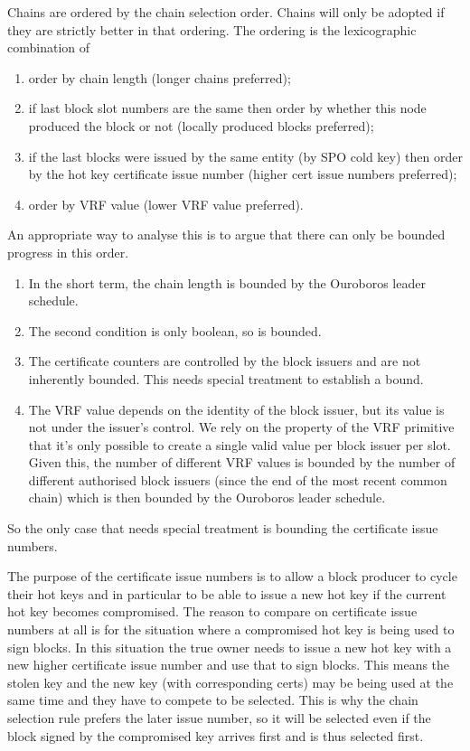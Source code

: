 \documentclass[11pt,a4paper]{article}
\begin{document}
Chains are ordered by the chain selection order. Chains will only be adopted if
they are strictly better in that ordering. The ordering is the lexicographic
combination of
\begin{enumerate}
\item order by chain length (longer chains preferred);
\item if last block slot numbers are the same then order by whether this node produced the block or not (locally produced blocks preferred);
\item if the last blocks were issued by the same entity (by SPO cold key) then order by the hot key certificate issue number (higher cert issue numbers preferred);
\item order by VRF value (lower VRF value preferred).
\end{enumerate}
An appropriate way to analyse this is to argue that there can only be bounded
progress in this order.
\begin{enumerate}
\item In the short term, the chain length is bounded by the Ouroboros leader
      schedule.
\item The second condition is only boolean, so is bounded.
\item The certificate counters are controlled by the block issuers and are not
      inherently bounded. This needs special treatment to establish a bound.
\item The VRF value depends on the identity of the block issuer, but its value
      is not under the issuer's control. We rely on the property of the VRF
      primitive that it's only possible to create a single valid value per
      block issuer per slot. Given this, the number of different VRF values is
      bounded by the number of different authorised block issuers (since the
      end of the most recent common chain) which is then bounded by the
      Ouroboros leader schedule.
\end{enumerate}
So the only case that needs special treatment is bounding the certificate issue
numbers.

The purpose of the certificate issue numbers is to allow a block producer to
cycle their hot keys and in particular to be able to issue a new hot key if the
current hot key becomes compromised. The reason to compare on certificate issue
numbers at all is for the situation where a compromised hot key is being used
to sign blocks. In this situation the true owner needs to issue a new hot key
with a new higher certificate issue number and use that to sign blocks. This
means the stolen key and the new key (with corresponding certs) may be being
used at the same time and they have to compete to be selected. This is why the
chain selection rule prefers the later issue number, so it will be selected
even if the block signed by the compromised key arrives first and is thus
selected first.
\end{document}
